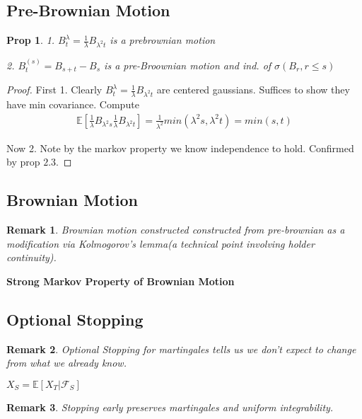 \documentclass[11pt]{article}
\newcommand{\E}{\mathbb{E}}
\newtheorem{prop}{Prop}
\newtheorem{remark}{Remark}
\begin{document}
\subsection{Pre-Brownian Motion}

\begin{prop}
	1. $B_t^{\lambda} = \frac{1}{\lambda}B_{\lambda^2 t}$ is a prebrownian motion

	2. $B_t^{(s)} = B_{s+t} - B_s$ is a pre-Broownian motion and ind. of $\sigma(B_r, r \leq s)$
\end{prop}

\begin{proof}
	First 1. Clearly $B_t^{\lambda} = \frac{1}{\lambda}B_{\lambda^2 t}$ are centered gaussians. Suffices to show they have min covariance. Compute
	\begin{align*}
		\E[\frac{1}{\lambda}B_{\lambda^2 s}\frac{1}{\lambda}B_{\lambda^2 t}] = \frac{1}{\lambda^2} min(\lambda^2s,\lambda^2 t) = min(s,t)
	\end{align*}

	Now 2. Note by the markov property we know independence to hold. Confirmed by prop $2.3$. 
\end{proof}

\subsection{Brownian Motion}

\begin{remark}
	Brownian motion constructed constructed from pre-brownian as a modification via Kolmogorov's lemma(a technical point involving holder continuity). 
\end{remark}



\textbf{Strong Markov Property of Brownian Motion}

\subsection{Optional Stopping}

\begin{remark}
	Optional Stopping for martingales tells us we don't expect to change from what we already know.

	$X_S = \E[X_T | \mathcal{F}_S]$
\end{remark}

\begin{remark}
	Stopping early preserves martingales and uniform integrability.
\end{remark}
\end{document}
